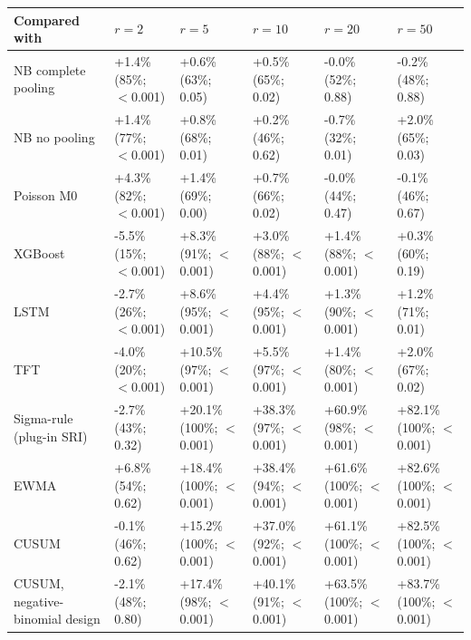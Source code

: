 \begin{landscape}
\noindent\begin{minipage}{\linewidth}
\label{tab:S20}
\centering\scriptsize
\begin{tabular}{llllll}
\toprule
Compared with & $r = 2$ & $r = 5$ & $r = 10$ & $r = 20$ & $r = 50$ \\ \midrule
NB complete pooling & +1.4\% (85\%; $<$0.001) & +0.6\% (63\%; 0.05) & +0.5\% (65\%; 0.02) & -0.0\% (52\%; 0.88) & -0.2\% (48\%; 0.88) \\
NB no pooling & +1.4\% (77\%; $<$0.001) & +0.8\% (68\%; 0.01) & +0.2\% (46\%; 0.62) & -0.7\% (32\%; 0.01) & +2.0\% (65\%; 0.03) \\
Poisson M0 & +4.3\% (82\%; $<$0.001) & +1.4\% (69\%; 0.00) & +0.7\% (66\%; 0.02) & -0.0\% (44\%; 0.47) & -0.1\% (46\%; 0.67) \\
XGBoost & -5.5\% (15\%; $<$0.001) & +8.3\% (91\%; $<$0.001) & +3.0\% (88\%; $<$0.001) & +1.4\% (88\%; $<$0.001) & +0.3\% (60\%; 0.19) \\
LSTM & -2.7\% (26\%; $<$0.001) & +8.6\% (95\%; $<$0.001) & +4.4\% (95\%; $<$0.001) & +1.3\% (90\%; $<$0.001) & +1.2\% (71\%; 0.01) \\
TFT & -4.0\% (20\%; $<$0.001) & +10.5\% (97\%; $<$0.001) & +5.5\% (97\%; $<$0.001) & +1.4\% (80\%; $<$0.001) & +2.0\% (67\%; 0.02) \\
Sigma-rule (plug-in SRI) & -2.7\% (43\%; 0.32) & +20.1\% (100\%; $<$0.001) & +38.3\% (97\%; $<$0.001) & +60.9\% (98\%; $<$0.001) & +82.1\% (100\%; $<$0.001) \\
EWMA & +6.8\% (54\%; 0.62) & +18.4\% (100\%; $<$0.001) & +38.4\% (94\%; $<$0.001) & +61.6\% (100\%; $<$0.001) & +82.6\% (100\%; $<$0.001) \\
CUSUM & -0.1\% (46\%; 0.62) & +15.2\% (100\%; $<$0.001) & +37.0\% (92\%; $<$0.001) & +61.1\% (100\%; $<$0.001) & +82.5\% (100\%; $<$0.001) \\
CUSUM, negative-binomial design & -2.1\% (48\%; 0.80) & +17.4\% (98\%; $<$0.001) & +40.1\% (91\%; $<$0.001) & +63.5\% (100\%; $<$0.001) & +83.7\% (100\%; $<$0.001) \\

\end{tabular}
\end{minipage}
\end{landscape}
